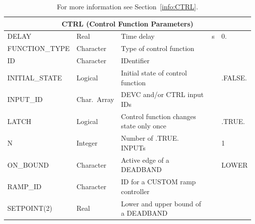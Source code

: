 \documentclass[11pt]{book}
\begin{document}
\hspace{1in}

\begin{table}[H]
\caption{For more information see Section~\ref{info:CTRL}.}\label{tbl:CTRL}
\noindent
\begin{tabular*}{6.5in}{@{\extracolsep\fill}|l|l|l|l|l|}
\hline
\multicolumn{5}{|c|}{{\ct CTRL} (Control Function Parameters)} \\ \hline \hline
{\ct DELAY}          & Real         & Time delay                                  & s  &  0.                       \\ \hline
{\ct FUNCTION\_TYPE} & Character    & Type of control function                    &    &                           \\ \hline
{\ct ID}             & Character    & IDentifier                                  &    &                           \\ \hline
{\ct INITIAL\_STATE} & Logical      & Initial state of control function           &    & {\ct .FALSE.}             \\ \hline
{\ct INPUT\_ID}      & Char.~Array  & DEVC and/or CTRL input {\ct ID}s            &    &                           \\ \hline
{\ct LATCH}          & Logical      & Control function changes state only once    &    & {\ct .TRUE.}              \\ \hline
{\ct N}              & Integer      & Number of .TRUE. {\ct INPUT}s               &    &   1                       \\ \hline
{\ct ON\_BOUND}      & Character    & Active edge of a {\ct DEADBAND}             &    & {\ct LOWER}               \\ \hline
{\ct RAMP\_ID}       & Character    & {\ct ID} for a {\ct CUSTOM} ramp controller &    &                           \\ \hline
{\ct SETPOINT(2)}    & Real         & Lower and upper bound of a {\ct DEADBAND}   &    &                           \\ \hline
\end{tabular*}
\end{table}
\end{document}
